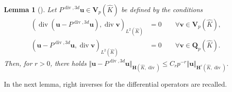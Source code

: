 \documentclass{article}
\newtheorem{lemma}[theorem]{Lemma}
\begin{document}
\begin{lemma}
[\!\!]
\label{lemma:Pdiv3d} Let $P^{\operatorname*{div},3d}{\mathbf{u}}%
\in\mathbf{V}_{p}(\widehat{K})$ be defined
by the conditions
\begin{subequations}
\begin{align}
\label{eq:lemma:Pdiv3d}
(\operatorname{div}({\mathbf{u}}-P^{\operatorname*{div},3d}{\mathbf{u}%
}),\operatorname{div}{\mathbf{v}})_{L^{2}(\widehat{K})}  &  =0\qquad
\forall{\mathbf{v}}\in\mathbf{V}_p(\widehat{K}),\\
({\mathbf{u}}-P^{\operatorname*{div},3d}{\mathbf{u}},\operatorname*{div} \mathbf{v})_{L^{2}(\widehat{K})}  &  =0\qquad\forall \mathbf{v}\in \mathbf{Q}_p(\widehat{K}).
\label{eq:lemma:Pdiv3d-20}
\end{align}
\end{subequations}
Then, for $r > 0$, there holds 
$\displaystyle 
\Vert{\mathbf{u}}-P^{\operatorname*{div},3d}{\mathbf{u}}\Vert_{{\mathbf{H}%
}(\widehat{K},\operatorname{div})}\leq C_{r}p^{-r}\Vert{\mathbf{u}}%
\Vert_{{\mathbf{H}}^{r}(\widehat{K},\operatorname{div})}.
$
\end{lemma}

In the next lemma, right inverses for the differential operators are recalled.
\end{document}
